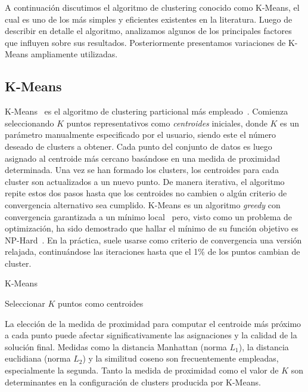 A continuación discutimos el algoritmo de clustering conocido como K-Means, el cual es uno de los más simples y eficientes existentes en la literatura.
Luego de describir en detalle el algoritmo, analizamos algunos de los principales factores que influyen sobre sus resultados.
Posteriormente presentamos variaciones de K-Means ampliamente utilizadas.

\subsection{K-Means}\label{subsec:k-means}

K-Means~\cite{MacQueen67} es el algoritmo de clustering particional más empleado~\cite{Aggarawal13}.
Comienza seleccionando $K$ puntos representativos como \textit{centroides} iniciales, donde $K$ es un parámetro manualmente especificado por el usuario, siendo este el número deseado de clusters a obtener.
Cada punto del conjunto de datos es luego asignado al centroide más cercano basándose en una medida de proximidad determinada.
Una vez se han formado los clusters, los centroides para cada cluster son actualizados a un nuevo punto.
De manera iterativa, el algoritmo repite estos dos pasos hasta que los centroides no cambien o algún criterio de convergencia alternativo sea cumplido.
K-Means es un algoritmo \textit{greedy} con convergencia garantizada a un mínimo local~\cite{Selim84} pero, visto como un problema de optimización, ha sido demostrado que hallar el mínimo de su función objetivo es NP-Hard~\cite{Manning08}.
En la práctica, suele usarse como criterio de convergencia una versión relajada, continuándose las iteraciones hasta que el 1\% de los puntos cambian de cluster.

\begin{algorithm}
    \caption{K-Means}
    \label{algorithm:KMeans}
    Seleccionar $K$ puntos como centroides\;
\end{algorithm}

La elección de la medida de proximidad para computar el centroide más próximo a cada punto puede afectar significativamente las asignaciones y la calidad de la solución final.
Medidas como la distancia Manhattan (norma $L_1$), la distancia euclidiana (norma $L_2$) y la similitud coseno son frecuentemente empleadas, especialmente la segunda.
Tanto la medida de proximidad como el valor de $K$ son determinantes en la configuración de clusters producida por K-Means.

